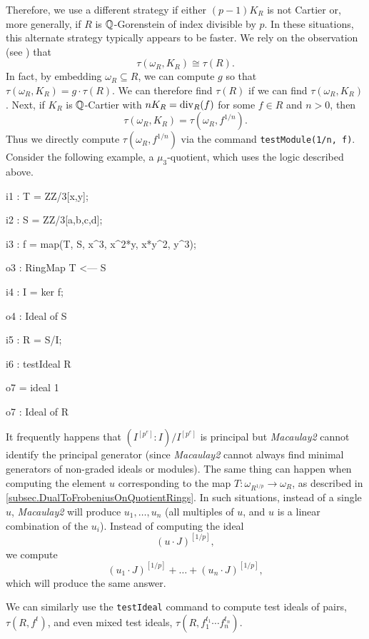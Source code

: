 \documentclass{amsart}
\begin{document}
Therefore, we use a different strategy if either $(p-1)K_R$ is not Cartier or, more generally, if $R$ is $\mathbb{Q}$-Gorenstein of index divisible by $p$.
In these situations, this alternate strategy typically appears to be faster.  We rely on the observation (see \cite{BlickleSchwedeTuckerTestAlterations}) that
\[
\tau(\omega_R, K_R) \cong \tau(R).
\]
In fact, by embedding $\omega_R \subseteq R$, we can compute $g$ so that $\tau(\omega_R, K_R) = g\cdot \tau(R)$.  We can therefore find $\tau(R)$ if we can find $\tau(\omega_R, K_R)$.
Next, if $K_R$ is $\mathbb{Q}$-Cartier with $nK_R = \operatorname{{div}}_R(f)$ for some $f \in R$ and $n > 0$, then
\[
\tau(\omega_R, K_R) =\tau(\omega_R, f^{1/n}).
\]
Thus we directly compute $\tau(\omega_R, f^{1/n})$ via the command \texttt{testModule(1/n, f)}.  Consider the following example, a $\mu_3$-quotient, which uses the logic described above.

\medskip
{\small
{}
\begin{MyVerbatim}
i1 : T = ZZ/3[x,y];

i2 : S = ZZ/3[a,b,c,d];

i3 : f = map(T, S, {x^3, x^2*y, x*y^2, y^3});

o3 : RingMap T <--- S

i4 : I = ker f;

o4 : Ideal of S

i5 : R = S/I;

i6 : testIdeal R

o7 = ideal 1

o7 : Ideal of R
\end{MyVerbatim}
}\medskip


\begin{remark}
   It frequently happens that $(I^{[p^e]} : I)/I^{[p^e]}$ is principal but \emph{Macaulay2} cannot identify the principal generator (since \emph{Macaulay2} cannot always find minimal generators of non-graded ideals or modules).
   The same thing can happen when computing the element $u$ corresponding to the map $T : \omega_{R^{1/p}} \to \omega_R$, as described in \autoref{subsec.DualToFrobeniusOnQuotientRings}.
   In such situations, instead of a single $u$, \emph{Macaulay2} will produce $u_1, \dots, u_n$ (all multiples of $u$, and $u$ is a linear combination of the $u_i$).  Instead of computing the ideal
\[
(u \cdot J)^{[1/p]},
\]
we compute
\[
(u_1 \cdot J)^{[1/p]} + \dots + (u_n \cdot J)^{[1/p]},
\]
which will produce the same answer.
\end{remark}

We can similarly use the \texttt{testIdeal} command to compute test ideals of pairs, $\tau(R, f^t)$, and even mixed test ideals, $\tau(R, f_1^{t_1} \cdots f_n^{t_n})$.
\end{document}
